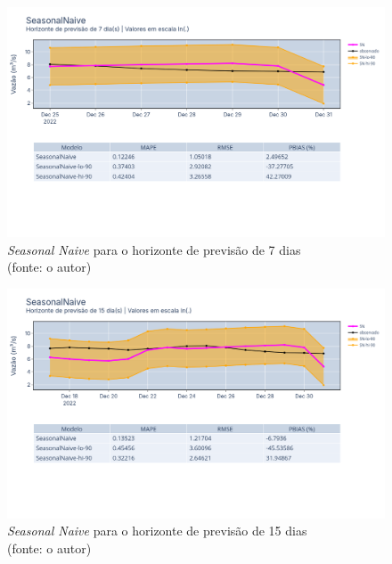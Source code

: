 \begin{figure}[!h]
	\centering
	\includegraphics[scale=0.33]{Figuras/jequiti/resultados/SeasonalNaive_fh7.png}
	\caption{\textit{Seasonal Naive} para o horizonte de previsão de 7 dias\\(fonte: o autor)}
	\label{fig:jequiti_SeasonalNaive_fh7}
\end{figure}

\begin{figure}[!h]
	\centering
	\includegraphics[scale=0.33]{Figuras/jequiti/resultados/SeasonalNaive_fh15.png}
	\caption{\textit{Seasonal Naive} para o horizonte de previsão de 15 dias\\(fonte: o autor)}
	\label{fig:jequiti_SeasonalNaive_fh15}
\end{figure}

